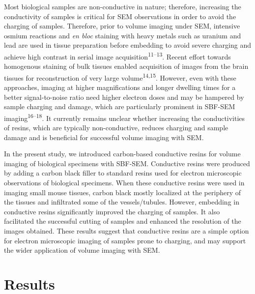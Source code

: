 \documentclass{article}
\begin{document}
Most biological samples are non-conductive in nature; therefore, increasing the conductivity of samples is critical for SEM observations in order to avoid the charging of samples. Therefore, prior to volume imaging under SEM, intensive osmium reactions and \emph{en bloc} staining with heavy metals such as uranium and lead are used in tissue preparation before embedding to avoid severe charging and achieve high contrast in serial image acquisition\textsuperscript{11–13}. Recent effort towards homogenous staining of bulk tissues enabled acquisition of images from the brain tissues for reconstruction of very large volume\textsuperscript{14,15}. However, even with these approaches, imaging at higher magnifications and longer dwelling times for a better signal-to-noise ratio need higher electron doses and may be hampered by sample charging and damage, which are particularly prominent in SBF-SEM imaging\textsuperscript{16–18}. It currently remains unclear whether increasing the conductivities of resins, which are typically non-conductive, reduces charging and sample damage and is beneficial for successful volume imaging with SEM.

In the present study, we introduced carbon-based conductive resins for volume imaging of biological specimens with SBF-SEM. Conductive resins were produced by adding a carbon black filler to standard resins used for electron microscopic observations of biological specimens. When these conductive resins were used in imaging small mouse tissues, carbon black mostly localized at the periphery of the tissues and infiltrated some of the vessels/tubules. However, embedding in conductive resins significantly improved the charging of samples. It also facilitated the successful cutting of samples and enhanced the resolution of the images obtained. These results suggest that conductive resins are a simple option for electron microscopic imaging of samples prone to charging, and may support the wider application of volume imaging with SEM.

\section*{Results}
\end{document}
